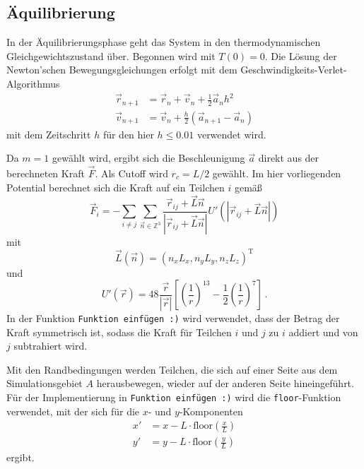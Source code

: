 \subsection*{Äquilibrierung}
In der Äquilibrierungsphase geht das System in den thermodynamischen Gleichgewichtszustand über.
Begonnen wird mit $T(0) = 0$. Die Lösung der Newton'schen Bewegungsgleichungen erfolgt mit dem Geschwindigkeits-Verlet-Algorithmus
\begin{align*}
    \vec{r}_{n+1} &= \vec{r}_n + \vec{v}_n + \frac{1}{2} \vec{a}_n h^2 \\
    \vec{v}_{n+1} &= \vec{v}_n + \frac{h}{2} \left(\vec{a}_{n+1} - \vec{a}_{n}\right)
\end{align*}
mit dem Zeitschritt $h$ für den hier $h \leq 0.01$ verwendet wird. 

Da $m = 1$ gewählt wird, ergibt sich die Beschleunigung $\vec{a}$ direkt aus der berechneten Kraft $\vec{F}$.
Als Cutoff wird $r_c = L/2$ gewählt. Im hier vorliegenden Potential berechnet sich die Kraft auf ein Teilchen $i$ gemäß
\begin{equation*}
    \vec{F}_{i} = - \sum_{i \neq j} \sum_{\vec{n} \in \mathbb{Z}^3} \frac{\vec{r}_{ij} + \vec{L} \vec{n}}{\left|\vec{r}_{ij} + \vec{L} \vec{n}\right|} U'\left(\left|\vec{r}_{ij} + \vec{L} \vec{n}\right|\right)
\end{equation*}
mit
\begin{equation*}
    \vec{L} \left(\vec{n}\right) = \left(n_x L_x, n_y L_y, n_z L_z\right)^{\text{T}}
\end{equation*}
und 
\begin{equation*}
    U' \left(\vec{r}\right) = 48 \frac{\vec{r}}{\left|\vec{r}\right|} \left[\left(\frac{1}{r}\right)^{13} - \frac{1}{2} \left(\frac{1}{r}\right)^{7}\right] \, .
\end{equation*}
In der Funktion \texttt{Funktion einfügen :)} wird verwendet, dass der Betrag der Kraft symmetrisch ist, sodass
die Kraft für Teilchen $i$ und $j$ zu $i$ addiert und von $j$ subtrahiert wird. 

Mit den Randbedingungen werden Teilchen, die sich auf einer Seite aus dem Simulationsgebiet $A$ herausbewegen, wieder auf der anderen Seite 
hineingeführt.
Für der Implementierung in \texttt{Funktion einfügen :)} wird die \texttt{floor}-Funktion verwendet, mit der sich 
für die $x$- und $y$-Komponenten
\begin{align*}
    x' &= x - L \cdot \text{floor}\left(\frac{x}{L}\right) \\
    y' &= y - L \cdot \text{floor}\left(\frac{y}{L}\right) 
\end{align*}
ergibt.

